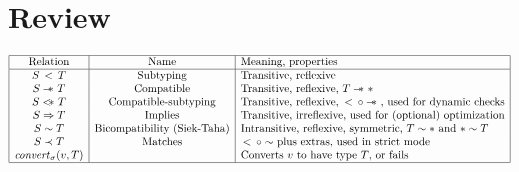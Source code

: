 \documentclass{article}
\newcommand{\fun}[1]{\mbox{\it #1\/}}
\newcommand{\dynamic}{\t{*}}
\newcommand{\matches}[2]{#1 \prec #2}
\newcommand{\subtypeword}{\,<\,}
\newcommand{\subtype}[2]{#1 \subtypeword #2}
\newcommand{\compatible}[2]{#1 \leadsto #2}
\renewcommand{\compatible}[2]{#1 -\!\!\!*\,\, #2}
\newcommand{\comsubtype}[2]{#1 <\!\!\leadsto #2}
\renewcommand{\comsubtype}[2]{#1 <\!\!\!*\,\, #2}
\newcommand{\bicompatible}[2]{#1 \sim #2}
\newcommand{\convert}[2]{{#1}\convertword{#2}}
\newcommand{\convertword}{\mbox{\,\,$\sim :$\,\,}}
\newcommand{\implies}[2]{#1\Implies #2}
\renewcommand{\t}[1]{{\tt #1}}
\newcommand{\Implies}[0]{\Rightarrow}
\renewcommand{\convert}[2]{\fun{convert}_{\sigma}(#1,#2)}
\begin{document}
\clearpage
\section{Review}

\[
\begin{array}{|c|c|l|}
\hline
\mbox{Relation} & \mbox{Name} & \mbox{Meaning, properties} \\
\hline
\subtype{S}{T} 			& \mbox{Subtyping} 			& \mbox{Transitive, reflexive}\\
\compatible{S}{T}		&\mbox{Compatible}		& \mbox{Transitive, reflexive, $\compatible{T}{\dynamic}$} \\
\comsubtype S T		&\mbox{Compatible-subtyping} & \mbox{Transitive, reflexive, $\subtype{}{}\circ\compatible{}{}$, used for dynamic checks}\\
\implies S T 			&\mbox{Implies}			&\mbox{Transitive, irreflexive, used for (optional) optimization}\\
\bicompatible S T			&\mbox{Bicompatibility (Siek-Taha)}		&\mbox{Intransitive, reflexive, symmetric, $\bicompatible T \dynamic$ and $\bicompatible \dynamic T$} \\
\matches S T			&\mbox{Matches}				&\mbox{$\subtype{}{}\circ\bicompatible{}{}$ plus extras, used in strict mode}\\
\convert v T			&\mbox{}					&\mbox{Converts $v$ to have type $T$, or fails} \\
\hline
\end{array}
\]
\end{document}
